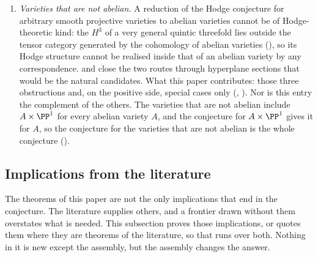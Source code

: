 \begin{enumerate}[label=\textup{(C\arabic*)},leftmargin=3.0em,itemsep=4pt]
  \cite{MZ99}, and in dimension eight it does: the self-product of an abelian
  fourfold of Mumford type carries two Hodge classes that are neither
  products of divisor classes nor Weil classes of any quotient
  (). So the Hodge conjecture for abelian varieties
  does not reduce to Weil classes, and the statement needed is the
  algebraicity of these classes themselves. What this paper contributes: the
  example, made exact, and the forms of their algebraicity studied in
  .
\item \emph{Varieties that are not abelian.} A reduction of the Hodge
  conjecture for arbitrary smooth projective varieties to abelian varieties
  cannot be of Hodge-theoretic kind: the $H^{3}$ of a very
  general quintic threefold lies outside the tensor category generated by the
  cohomology of abelian varieties (), so its Hodge
  structure cannot be realised inside that of an abelian variety by any
  correspondence. \cite[Theorem~10.3]{paperI} and \cite[Theorem~10.8]{paperI} close the
  two routes through hyperplane sections that would be the natural candidates.
  What this paper contributes: those three obstructions and, on the positive
  side, special cases only (,
  ). Nor is this entry the complement of the others. The varieties
  that are not abelian include $A\times\PP^{1}$ for every abelian variety
  $A$, and the
  conjecture for $A\times\PP^{1}$ gives it for $A$, so the conjecture for
  the varieties that are not abelian is the whole conjecture
  ().
\end{enumerate}

\subsection{Implications from the literature}\label{ssec:bullseye}

The theorems of this paper are not the only implications that end in the
conjecture. The literature supplies others, and a frontier drawn without
them overstates what is needed. This subsection proves those implications, or
quotes them where they are theorems of the literature, so that
 runs over both. Nothing in it is new
except the assembly, but the assembly changes the answer.

